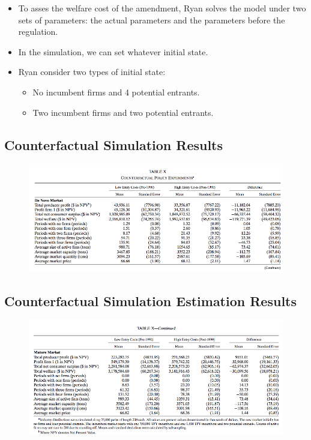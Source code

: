 \documentclass[]{book}
\providecommand{\tightlist}{%
  \setlength{\itemsep}{0pt}\setlength{\parskip}{0pt}}
\begin{document}
\begin{itemize}
\tightlist
\item
  To asses the welfare cost of the amendment, Ryan solves the model
  under two sets of parameters: the actual parameters and the parameters
  before the regulation.
\item
  In the simulation, we can set whatever initial state.
\item
  Ryan consider two types of initial state:

  \begin{itemize}
  \tightlist
  \item
    No incumbent firms and 4 potential entrants.
  \item
    Two incumbent firms and two potential entrants.
  \end{itemize}
\end{itemize}

\subsection{Counterfactual Simulation
Results}\label{counterfactual-simulation-results}

\begin{figure}

{\centering \includegraphics[width=0.8\linewidth]{figuretable/denovo} 

}

\end{figure}

\subsection{Counterfactual Simulation Estimation
Results}\label{counterfactual-simulation-estimation-results}

\begin{figure}

{\centering \includegraphics[width=0.8\linewidth]{figuretable/mature} 

}

\end{figure}
\end{document}

